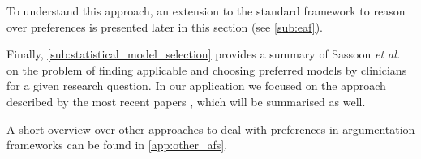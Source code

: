 To understand this approach, an extension to the standard framework to reason over preferences is presented later in this section (see \autoref{sub:eaf}). 

Finally, \autoref{sub:statistical_model_selection} provides a summary of Sassoon \textit{et al.} \cite{sassoon2014} on the problem of finding applicable and choosing preferred models by clinicians for a given research question. In our application we focused on the approach described by the most recent papers \cite{sassoon2016,sassoon2016CD}, which will be summarised as well.





A short overview over other approaches to deal with preferences in argumentation frameworks can be found in \autoref{app:other_afs}. 


% 
